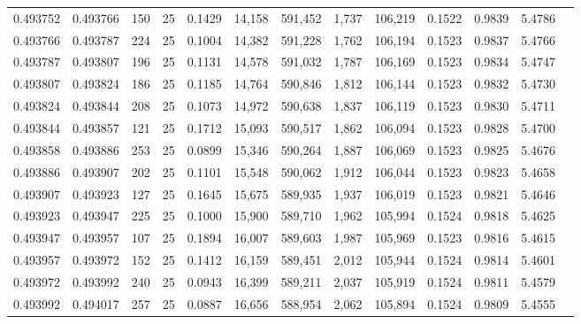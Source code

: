 \begin{tabular}{rrrrrrrrrrrrr}
0.493752 & 0.493766 & 150 &  25 &                                     0.1429 &  14,158 & 591,452 &   1,737 & 106,219 & 0.1522 & 0.9839 & 5.4786 \\
0.493766 & 0.493787 & 224 &  25 &                                     0.1004 &  14,382 & 591,228 &   1,762 & 106,194 & 0.1523 & 0.9837 & 5.4766 \\
0.493787 & 0.493807 & 196 &  25 &                                     0.1131 &  14,578 & 591,032 &   1,787 & 106,169 & 0.1523 & 0.9834 & 5.4747 \\
0.493807 & 0.493824 & 186 &  25 &                                     0.1185 &  14,764 & 590,846 &   1,812 & 106,144 & 0.1523 & 0.9832 & 5.4730 \\
0.493824 & 0.493844 & 208 &  25 &                                     0.1073 &  14,972 & 590,638 &   1,837 & 106,119 & 0.1523 & 0.9830 & 5.4711 \\
0.493844 & 0.493857 & 121 &  25 &                                     0.1712 &  15,093 & 590,517 &   1,862 & 106,094 & 0.1523 & 0.9828 & 5.4700 \\
0.493858 & 0.493886 & 253 &  25 &                                     0.0899 &  15,346 & 590,264 &   1,887 & 106,069 & 0.1523 & 0.9825 & 5.4676 \\
0.493886 & 0.493907 & 202 &  25 &                                     0.1101 &  15,548 & 590,062 &   1,912 & 106,044 & 0.1523 & 0.9823 & 5.4658 \\
0.493907 & 0.493923 & 127 &  25 &                                     0.1645 &  15,675 & 589,935 &   1,937 & 106,019 & 0.1523 & 0.9821 & 5.4646 \\
0.493923 & 0.493947 & 225 &  25 &                                     0.1000 &  15,900 & 589,710 &   1,962 & 105,994 & 0.1524 & 0.9818 & 5.4625 \\
0.493947 & 0.493957 & 107 &  25 &                                     0.1894 &  16,007 & 589,603 &   1,987 & 105,969 & 0.1523 & 0.9816 & 5.4615 \\
0.493957 & 0.493972 & 152 &  25 &                                     0.1412 &  16,159 & 589,451 &   2,012 & 105,944 & 0.1524 & 0.9814 & 5.4601 \\
0.493972 & 0.493992 & 240 &  25 &                                     0.0943 &  16,399 & 589,211 &   2,037 & 105,919 & 0.1524 & 0.9811 & 5.4579 \\
0.493992 & 0.494017 & 257 &  25 &                                     0.0887 &  16,656 & 588,954 &   2,062 & 105,894 & 0.1524 & 0.9809 & 5.4555 \\

\end{tabular}

